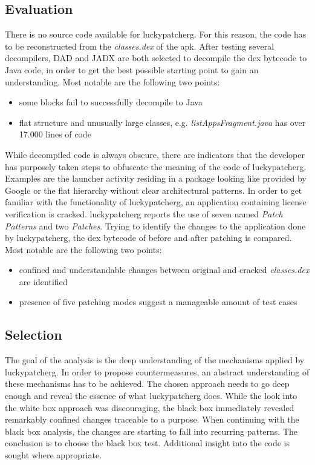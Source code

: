 \subsection{Evaluation}
There is no source code available for \gls{luckypatcherg}.
For this reason, the code has to be reconstructed from the \textit{classes.dex} of the \gls{apk}.
After testing several decompilers, DAD and JADX are both selected to decompile the dex bytecode to Java code, in order to get the best possible starting point to gain an understanding.
Most notable are the following two points:
\begin{itemize}
\item some blocks fail to successfully decompile to Java
\item flat structure and unusually large classes, e.g. \textit{listAppsFragment.java} has over 17.000 lines of code
\end{itemize}
While decompiled code is always obscure, there are indicators that the developer has purposely taken steps to obfuscate the meaning of the code of \gls{luckypatcherg}.
Examples are the launcher activity residing in a package looking like provided by Google or the flat hierarchy without clear architectural patterns.
\newline
In order to get familiar with the functionality of \gls{luckypatcherg}, an application containing license verification is cracked.
\gls{luckypatcherg} reports the use of seven named \textit{Patch Patterns} and two \textit{Patches}.
Trying to identify the changes to the application done by \gls{luckypatcherg}, the dex bytecode of before and after patching is compared.
Most notable are the following two points:
\begin{itemize}
\item confined and understandable changes between original and cracked \textit{classes.dex} are identified
\item presence of five patching modes suggest a manageable amount of test cases
\end{itemize}

\subsection{Selection}
The goal of the analysis is the deep understanding of the mechanisms applied by \gls{luckypatcherg}.
In order to propose countermeasures, an abstract understanding of these mechanisms has to be achieved.
The chosen approach needs to go deep enough and reveal the essence of what \gls{luckypatcherg} does.
\newline
While the look into the white box approach was discouraging, the black box immediately revealed remarkably confined changes traceable to a purpose.
When continuing with the black box analysis, the changes are starting to fall into recurring patterns.
\newline
The conclusion is to choose the black box test.
Additional insight into the code is sought where appropriate.
